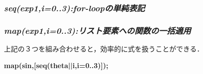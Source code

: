 \documentclass{article}
\begin{document}
\subsubsection{\textit{seq(exp1,i=0..3):for-loopの単純表記}}
\begin{maplegroup}
\begin{mapleinput}
\end{mapleinput}
\mapleresult
\begin{maplelatex}
\end{maplelatex}
\end{maplegroup}
\subsubsection{\textit{map(exp1,i=0..3):リスト要素への関数の一括適用}}
\begin{maplegroup}
\begin{mapleinput}
\end{mapleinput}
\mapleresult
\begin{maplelatex}
\end{maplelatex}
\mapleresult
\begin{maplelatex}
\end{maplelatex}
\end{maplegroup}
\begin{maplegroup}
\begin{Maple Normal}{
上記の３つを組み合わせると，効率的に式を扱うことができる．}\end{Maple Normal}

\textbf{map(sin,[seq(theta||i,i=0..3)]);}\mapleresult
\begin{maplelatex}
\end{maplelatex}
\end{maplegroup}
\end{document}
